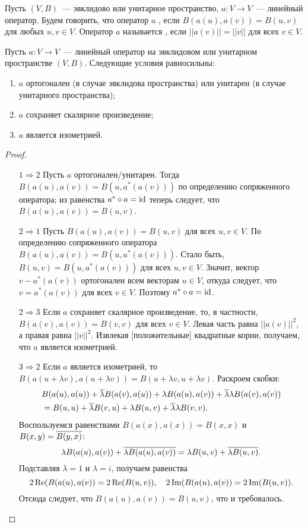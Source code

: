 \begin{definition}
Пусть $(V,B)$~--- эвклидово или унитарное пространство,
$a\colon V\to V$~--- линейный оператор.
Будем говорить, что оператор $a$ ,
если $B(a(u),a(v))=B(u,v)$ для любых $u,v\in V$.
Оператор $a$ называется , если
$||a(v)|| = ||v||$ для всех $v\in V$.
\end{definition}

\begin{lemma}\label{lem:isometry_equiv}
Пусть $a\colon V\to V$~--- линейный оператор на эвклидовом или
унитарном пространстве $(V,B)$. Следующие условия равносильны:
\begin{enumerate}
\item $a$ ортогонален (в случае эвклидова пространства) или унитарен
  (в случае унитарного пространства);
\item $a$ сохраняет скалярное произведение;
\item $a$ является изометрией.
\end{enumerate}
\end{lemma}
\begin{proof}
\begin{itemize}
\item[$1\Rightarrow 2$] Пусть $a$ ортогонален/унитарен. Тогда
  $B(a(u),a(v)) = B(u,a^*(a(v)))$ по определению сопряженного оператора;
  из равенства $a^*\circ a = \operatorname{id}$ теперь следует, что $B(a(u),a(v)) =
  B(u,v)$.
\item[$2\Rightarrow 1$] Пусть $B(a(u),a(v))= B(u,v)$ для всех $u,v\in
  V$. По определению сопряженного оператора $B(a(u),a(v)) =
  B(u,a^*(a(v)))$. Стало быть, $B(u,v) = B(u,a^*(a(v)))$ для всех
  $u,v\in V$.  Значит, вектор $v-a^*(a(v))$ ортогонален всем векторам $u\in V$,
  откуда следует, что  $v = a^*(a(v))$ для
  всех $v\in V$. Поэтому $a^*\circ a = \operatorname{id}$.
\item[$2\Rightarrow 3$] Если $a$ сохраняет скалярное произведение, то,
  в частности, $B(a(v),a(v)) = B(v,v)$ для всех $v\in V$. Левая часть
  равна $||a(v)||^2$, а правая равна $||v||^2$. Извлекая
  [положительные] квадратные корни, получаем, что $a$ является
  изометрией.
\item[$3\Rightarrow 2$] Если $a$ является изометрией, то
  $B(a(u+\lambda v),a(u+\lambda v)) = B(u+\lambda v,u+\lambda
  v)$. Раскроем скобки:
  \begin{align*}
  &B(a(u),a(u)) + \overline\lambda B(a(v),a(u)) + \lambda B(a(u),a(v)) +
  \overline\lambda\lambda B(a(v),a(v))\\ &= B(u,u) + \overline\lambda B(v,u) +
  \lambda B(u,v) + \overline\lambda\lambda B(v,v).
  \end{align*}
  Воспользуемся равенствами $B(a(x),a(x)) = B(x,x)$ и $B(x,y) =
  \overline{B(y,x)}$:
  $$
  \lambda B(a(u),a(v)) + \overline{\lambda B(a(u),a(v))} =
  \lambda B(u,v) + \overline{\lambda B(u,v)}.
  $$
  Подставляя $\lambda=1$ и $\lambda = i$, получаем равенства
  $$
  2\operatorname{Re}(B(a(u),a(v)) = 2\operatorname{Re}(B(u,v)), \quad
  2\operatorname{Im}(B(a(u),a(v)) = 2\operatorname{Im}(B(u,v)).
  $$
  Отсюда следует, что $B(a(u),a(v)) = B(u,v)$, что и требовалось.
\end{itemize}
\end{proof}

